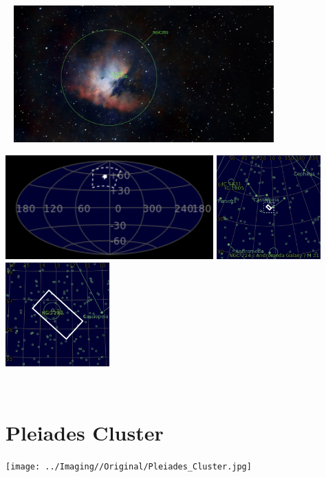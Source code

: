 \begin{center}
 \ \newpage
\includegraphics[width=0.75\textwidth]{../Imaging//Annotated/Pacman_Nebula_Annotated.jpg}

\includegraphics[height=4cm]{../Imaging//Annotated/Pacman_Nebula_Globe.jpg}
\includegraphics[height=4cm]{../Imaging//Annotated/Pacman_Nebula_Close.jpg}
\includegraphics[height=4cm]{../Imaging//Annotated/Pacman_Nebula_Closer.jpg}
\end{center}
\ \\\section{Pleiades Cluster}
\texttt{[image: ../Imaging//Original/Pleiades\_Cluster.jpg]}
{\footnotesize\color{white}


}\ \\
